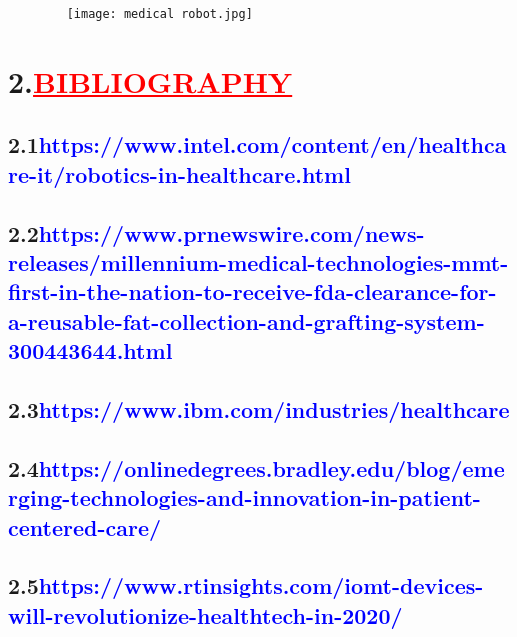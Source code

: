 \documentclass[12pt]{article}
\begin{document}
\begin{figure}
    \centering
    \texttt{[image: medical robot.jpg]}
\end{figure}

\section*{\textbf{2.\hspace{1cm}\textcolor{red}{\underline{\huge{BIBLIOGRAPHY}}}}}
\vspace{0.2cm}
\subsection*{\textbf{2.1\hspace{1cm}\large{\textcolor{blue}{https://www.intel.com/content/en/healthcare-it/robotics-in-healthcare.html}}}}
\subsection*{\textbf{2.2\hspace{1cm}\large{\textcolor{blue}{https://www.prnewswire.com/news-releases/millennium-medical-technologies-mmt-first-in-the-nation-to-receive-fda-clearance-for-a-reusable-fat-collection-and-grafting-system-300443644.html}}}}
\subsection*{\textbf{2.3\hspace{1cm}\large{\textcolor{blue}{https://www.ibm.com/industries/healthcare}}}}
\subsection*{\textbf{2.4\hspace{1cm}\large{\textcolor{blue}{https://onlinedegrees.bradley.edu/blog/emerging-technologies-and-innovation-in-patient-centered-care/}}}}
\subsection*{\textbf{2.5\hspace{1cm}\large{\textcolor{blue}{https://www.rtinsights.com/iomt-devices-will-revolutionize-healthtech-in-2020/}}}}
\end{document}
